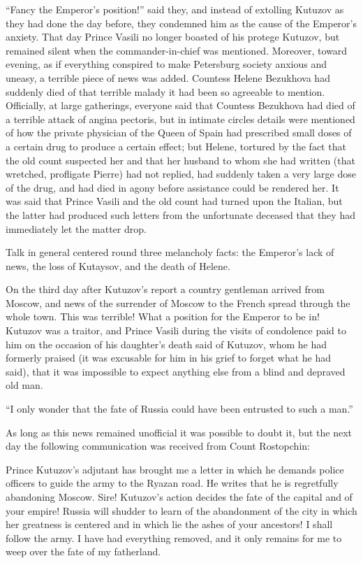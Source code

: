 ``Fancy the Emperor's position!'' said they, and instead of
extolling Kutuzov as they had done the day before, they condemned
him as the cause of the Emperor's anxiety. That day Prince Vasili
no longer boasted of his protege Kutuzov, but remained silent
when the commander-in-chief was mentioned. Moreover, toward
evening, as if everything conspired to make Petersburg society
anxious and uneasy, a terrible piece of news was added. Countess
Helene Bezukhova had suddenly died of that terrible malady it had
been so agreeable to mention. Officially, at large gatherings,
everyone said that Countess Bezukhova had died of a terrible
attack of angina pectoris, but in intimate circles details were
mentioned of how the private physician of the Queen of Spain had
prescribed small doses of a certain drug to produce a certain
effect; but Helene, tortured by the fact that the old count
suspected her and that her husband to whom she had written (that
wretched, profligate Pierre) had not replied, had suddenly taken
a very large dose of the drug, and had died in agony before
assistance could be rendered her. It was said that Prince Vasili
and the old count had turned upon the Italian, but the latter had
produced such letters from the unfortunate deceased that they had
immediately let the matter drop.

Talk in general centered round three melancholy facts: the
Emperor's lack of news, the loss of Kutaysov, and the death of
Helene.

On the third day after Kutuzov's report a country gentleman
arrived from Moscow, and news of the surrender of Moscow to the
French spread through the whole town. This was terrible! What a
position for the Emperor to be in! Kutuzov was a traitor, and
Prince Vasili during the visits of condolence paid to him on the
occasion of his daughter's death said of Kutuzov, whom he had
formerly praised (it was excusable for him in his grief to forget
what he had said), that it was impossible to expect anything else
from a blind and depraved old man.

``I only wonder that the fate of Russia could have been entrusted
to such a man.''

As long as this news remained unofficial it was possible to doubt
it, but the next day the following communication was received
from Count Rostopchin:

Prince Kutuzov's adjutant has brought me a letter in which he
demands police officers to guide the army to the Ryazan road. He
writes that he is regretfully abandoning Moscow. Sire! Kutuzov's
action decides the fate of the capital and of your empire! Russia
will shudder to learn of the abandonment of the city in which her
greatness is centered and in which lie the ashes of your
ancestors! I shall follow the army. I have had everything
removed, and it only remains for me to weep over the fate of my
fatherland.

